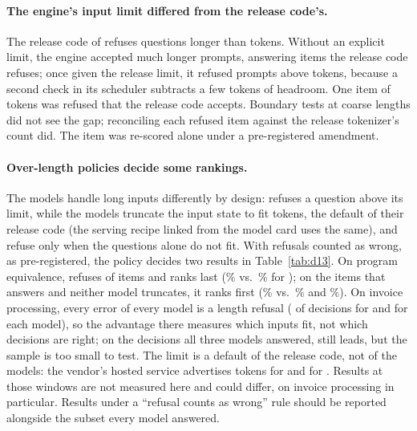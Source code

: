 \paragraph{The engine's input limit differed from the release code's.} The release code of \pplx{} refuses questions
longer than \dtLimitPplxRelease{} tokens. Without an explicit limit, the engine accepted much longer prompts,
answering items the release code refuses; once given the release limit, it refused prompts above
\dtLimitPplxServed{} tokens, because a second check in its scheduler subtracts a few tokens of headroom. One item of
\dtLimitAffectedTokens{} tokens was refused that the release code accepts. Boundary tests at coarse lengths did not
see the gap; reconciling each refused item against the release tokenizer's count did. The item was re-scored
alone under a pre-registered amendment.

\paragraph{Over-length policies decide some rankings.} The models handle long inputs differently by design: \pplx{}
refuses a question above its limit, while the \clef{} models truncate the input state to fit
\dtLimitClefRelease{} tokens, the default of their release code (the serving recipe linked from the model card uses
the same), and refuse only when the questions alone do not fit. With refusals counted as wrong, as
pre-registered, the policy decides two results in Table~\ref{tab:d13}. On program equivalence, \pplx{} refuses
\dtEquibenchPplxUnans{} of \dtEquibenchN{} items and ranks last (\dtEquibenchPplxAcc\% vs.\ \dtEquibenchClefAcc\% for
\clef); on the \dtEquibenchLflN{} items that \pplx{} answers and neither \clef{} model truncates, it ranks first
(\dtEquibenchPplxLflAcc\% vs.\ \dtEquibenchClefLflAcc\% and \dtEquibenchFlashLflAcc\%). On invoice processing, every
error of every model is a length refusal (\dtInvoicePplxErr{} of \dtInvoiceN{} decisions for \pplx{} and
\dtInvoiceClefErr{} for each \clef{} model), so the \pplx{} advantage there measures which inputs fit, not which
decisions are right; on the \dtInvoiceAllScoredN{} decisions all three models answered, \pplx{} still leads, but the
sample is too small to test. The \clef{} limit is a default of the release code, not of the models: the vendor's
hosted service advertises \dtLimitClefHosted{} tokens for \clef{} and \dtLimitFlashHosted{} for \flash. Results at
those windows are not measured here and could differ, on invoice processing in particular. Results under a ``refusal counts as wrong'' rule should be reported alongside the subset every
model answered.

